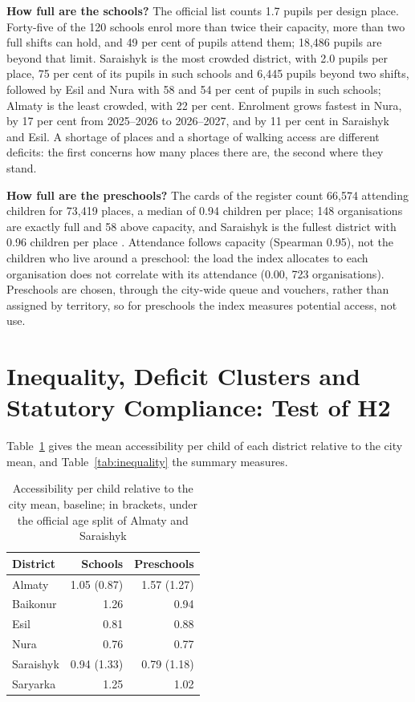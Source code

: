 \textbf{How full are the schools?} The official list counts 1.7 pupils per design place. Forty-five of the 120 schools enrol more than twice their capacity, more than two full shifts can hold, and 49 per cent of pupils attend them; 18,486 pupils are beyond that limit. Saraishyk is the most crowded district, with 2.0 pupils per place, 75 per cent of its pupils in such schools and 6,445 pupils beyond two shifts, followed by Esil and Nura with 58 and 54 per cent of pupils in such schools; Almaty is the least crowded, with 22 per cent. Enrolment grows fastest in Nura, by 17 per cent from 2025--2026 to 2026--2027, and by 11 per cent in Saraishyk and Esil. A shortage of places and a shortage of walking access are different deficits: the first concerns how many places there are, the second where they stand.

\textbf{How full are the preschools?} The cards of the register count 66,574 attending children for 73,419 places, a median of 0.94 children per place; 148 organisations are exactly full and 58 above capacity, and Saraishyk is the fullest district with 0.96 children per place \cite{indigocards2026}. Attendance follows capacity (Spearman 0.95), not the children who live around a preschool: the load the index allocates to each organisation does not correlate with its attendance (0.00, 723 organisations). Preschools are chosen, through the city-wide queue and vouchers, rather than assigned by territory, so for preschools the index measures potential access, not use.

\section{Inequality, Deficit Clusters and Statutory Compliance: Test of H2}
\label{sec:results-h2}

Table~\ref{tab:access-district} gives the mean accessibility per child of each district relative to the city mean, and Table~\ref{tab:inequality} the summary measures.

\begin{table}[ht]
\centering
\caption{Accessibility per child relative to the city mean, baseline; in brackets, under the official age split of Almaty and Saraishyk}
\label{tab:access-district}
\small
\begin{tabular}{lrr}
\toprule
District & Schools & Preschools \\
\midrule
Almaty & 1.05 (0.87) & 1.57 (1.27) \\
Baikonur & 1.26 & 0.94 \\
Esil & 0.81 & 0.88 \\
Nura & 0.76 & 0.77 \\
Saraishyk & 0.94 (1.33) & 0.79 (1.18) \\
Saryarka & 1.25 & 1.02 \\
\bottomrule
\end{tabular}
\end{table}

